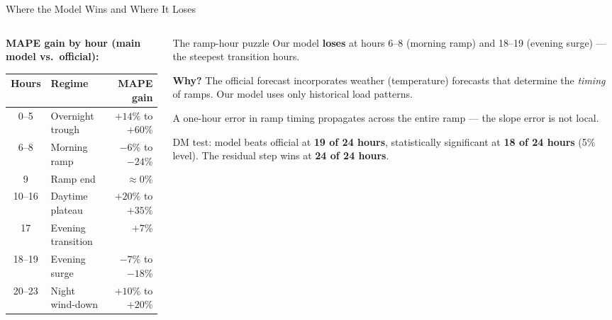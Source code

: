 \documentclass[10pt,aspectratio=169]{beamer}
\begin{document}
\begin{frame}{Where the Model Wins and Where It Loses}

  \begin{columns}
  \begin{column}{0.52\textwidth}
    \textbf{MAPE gain by hour (main model vs.\ official):}
    \vspace{0.2em}
    \begin{center}
    \small
    \begin{tabular}{clr}
      \toprule
      Hours & Regime & MAPE gain \\
      \midrule
      0--5  & Overnight trough & $+14\%$ to $+60\%$ \\
      \textcolor{accentred}{6--8}  & \textcolor{accentred}{Morning ramp} & \textcolor{accentred}{$-6\%$ to $-24\%$} \\
      9     & Ramp end & $\approx 0\%$ \\
      10--16 & Daytime plateau & $+20\%$ to $+35\%$ \\
      17     & Evening transition & $+7\%$ \\
      \textcolor{accentred}{18--19} & \textcolor{accentred}{Evening surge} & \textcolor{accentred}{$-7\%$ to $-18\%$} \\
      20--23 & Night wind-down & $+10\%$ to $+20\%$ \\
      \bottomrule
    \end{tabular}
    \end{center}
  \end{column}
  \begin{column}{0.44\textwidth}
    \begin{alertblock}{The ramp-hour puzzle}
      Our model \textbf{loses} at hours 6--8 (morning ramp) and
      18--19 (evening surge) --- the steepest transition hours.

      \vspace{0.3em}
      \textbf{Why?} The official forecast incorporates weather
      (temperature) forecasts that determine the \emph{timing}
      of ramps. Our model uses only historical load patterns.

      \vspace{0.3em}
      A one-hour error in ramp timing propagates across
      the entire ramp --- the slope error is not local.
    \end{alertblock}
    \vspace{0.4em}
    DM test: model beats official at \textbf{19 of 24 hours},
    statistically significant at \textbf{18 of 24 hours} (5\% level).
    The residual step wins at \textbf{24 of 24 hours}.
  \end{column}
  \end{columns}
\end{frame}
\end{document}

